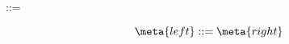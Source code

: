 \documentclass{ltugboat}
\begin{document}
 ::= 

\[ %
  \meta{left} : : = \meta{right}
\]
\end{document}

